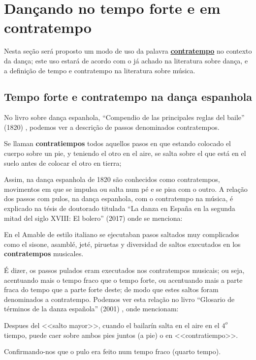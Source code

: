 \newpage
\section{Dançando no tempo forte e em contratempo}

Nesta seção será proposto um modo de uso da palavra 
\hyperref[sec:contratempo]{\textbf{contratempo}} no contexto da dança;
este uso estará de acordo com o já achado na literatura  sobre dança,
e a definição de tempo e contratempo na literatura sobre música.

\subsection{Tempo forte e contratempo na dança espanhola}
\label{subsec:contratempoespanha}
No livro sobre dança espanhola, ``Compendio de las principales reglas del baile'' (1820) \cite[pp. 131]{cairon1820compendio},
podemos ver a descrição de passos denominados contratempos.
\begin{citando}
Se llaman \textbf{contratiempos} todos aquellos pasos en que estando colocado el cuerpo sobre un pie,
y teniendo el otro en el aire,
se salta sobre el que está en el suelo antes de colocar el otro en tierra;
\end{citando}
Assim, na dança espanhola de 1820 são conhecidos como contratempos,
movimentos em que se impulsa ou salta num pé e se pisa com o outro. 
A relação dos passos com pulos, na dança espanhola, 
com o contratempo na música, 
é explicado na tésis de doutorado titulada 
``La danza en España en la segunda mitad del siglo XVIII: El bolero'' (2017)
\cite[pp. 160]{martin2017danza} onde se menciona:
\begin{citando}
En el Amable de estilo italiano se ejecutaban pasos saltados muy complicados como el sisone,
asamblé, jeté, piruetas y diversidad de saltos executados en los \textbf{contratempos} musicales.
\end{citando}
É dizer, os passos pulados eram executados nos contratempos musicais;
ou seja, acentuando mais o tempo fraco que o tempo forte,
ou acentuando mais a parte fraca do tempo que a parte forte deste;
de modo que estes saltos foram denominados a contratempo.
Podemos ver esta relação no livro ``Glosario de términos de la danza española'' (2001)
\cite[pp. 109]{aubero2001glosario}, onde mencionam:
\begin{citando}
Despues del <<salto mayor>>, cuando el bailarín salta en el aire en el $4^o$ tiempo,
puede caer sobre ambos pies juntos (a pie) o en <<contratiempo>>.
\end{citando}
Confirmando-nos que o pulo era feito num tempo fraco (quarto tempo).



